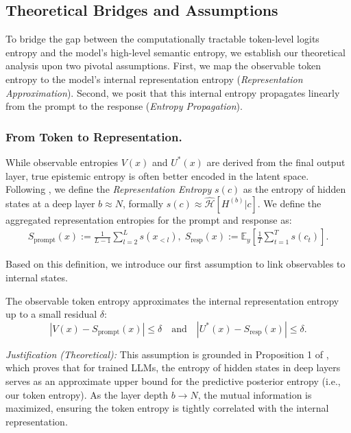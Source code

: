 \subsection{Theoretical Bridges and Assumptions}
\label{subsec:thm-theoretical-proof}
To bridge the gap between the computationally tractable token-level logits entropy and the model's high-level semantic entropy, we establish our theoretical analysis upon two pivotal assumptions. First, we map the observable token entropy to the model's internal representation entropy (\textit{Representation Approximation}). Second, we posit that this internal entropy propagates linearly from the prompt to the response (\textit{Entropy Propagation}).

\subsubsection{From Token to Representation.}
While observable entropies $V(x)$ and $U^*(x)$ are derived from the final output layer, true epistemic entropy is often better encoded in the latent space. Following \cite{flue2025}, we define the \textit{Representation Entropy} $s(c)$ as the entropy of hidden states at a deep layer $b \approx N$, formally $s(c) \approx \hat{\mathcal{H}}[H^{(b)}|c]$. We define the aggregated representation entropies for the prompt and response as:
\begin{equation}
\begin{split}
    S_{\text{prompt}}(x) := \frac{1}{L-1}\sum_{l=2}^L s(x_{<l}),\;
    S_{\text{resp}}(x) := \mathbb{E}_{y} \left[\frac{1}{T}\sum_{t=1}^{T} s(c_t)\right].
\end{split}
\end{equation}

Based on this definition, we introduce our first assumption to link observables to internal states.

\begin{assumption}
\label{ass:representation}
The observable token entropy approximates the internal representation entropy up to a small residual $\delta$:
\begin{equation}
  |V(x) - S_{\text{prompt}}(x)| \le \delta \quad \text{and} \quad |U^*(x) - S_{\text{resp}}(x)| \le \delta.
\end{equation}
\end{assumption}
\noindent\textit{{Justification (Theoretical):}} This assumption is grounded in Proposition 1 of \cite{flue2025}, which proves that for trained LLMs, the entropy of hidden states in deep layers serves as an approximate upper bound for the predictive posterior entropy (i.e., our token entropy). As the layer depth $b \to N$, the mutual information is maximized, ensuring the token entropy is tightly correlated with the internal representation.

